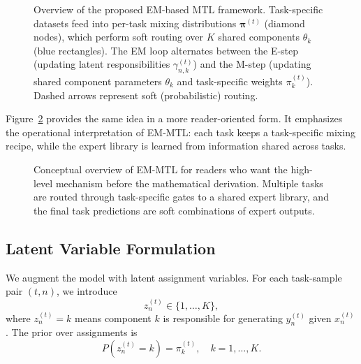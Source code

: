 \documentclass[preprint,12pt]{elsarticle}
\begin{document}
\begin{figure}[t]
		\caption{Overview of the proposed EM-based MTL framework. Task-specific
			datasets feed into per-task mixing distributions $\bm{\pi}^{(t)}$
			(diamond nodes), which perform soft routing over $K$ shared components
			$\theta_k$ (blue rectangles). The EM loop alternates between the
			\textcolor{red!70}{E-step} (updating latent responsibilities
			$\gamma_{n,k}^{(t)}$) and the \textcolor{blue!70}{M-step} (updating
			shared component parameters $\theta_k$ and task-specific weights
			$\pi_k^{(t)}$). Dashed arrows represent soft (probabilistic) routing.}
		\label{fig:model_overview}
	\end{figure}

	Figure~\ref{fig:conceptual_overview_png} provides the same idea in a
	more reader-oriented form. It emphasizes the operational interpretation
	of EM-MTL: each task keeps a task-specific mixing recipe, while the
	expert library is learned from information shared across tasks.

	\begin{figure}[t]
		\centering
		\caption{Conceptual overview of EM-MTL for readers who want the
			high-level mechanism before the mathematical derivation. Multiple
			tasks are routed through task-specific gates to a shared expert
			library, and the final task predictions are soft combinations of
			expert outputs.}
		\label{fig:conceptual_overview_png}
	\end{figure}
	
	\subsection{Latent Variable Formulation}
	
	We augment the model with latent assignment variables. For each
	task-sample pair $(t,n)$, we introduce
	\[
	z_n^{(t)} \in \{1, \dots, K\},
	\]
	where $z_n^{(t)} = k$ means component $k$ is responsible for
	generating $y_n^{(t)}$ given $x_n^{(t)}$. The prior over assignments is
	\[
	P\!\left(z_n^{(t)} = k\right) = \pi_k^{(t)},
	\quad k=1,\dots,K.
	\]
	
\end{document}
